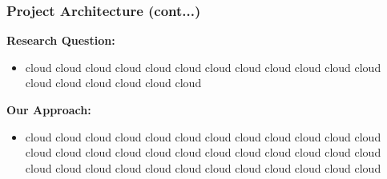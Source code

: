 \documentclass{beamer}
\begin{document}
\begin{frame}
\frametitle{Project Architecture (cont...)}
\textbf{Research Question:}
\begin{itemize}
  \item cloud cloud cloud cloud cloud cloud cloud cloud cloud cloud cloud cloud cloud cloud cloud cloud cloud cloud
\end{itemize}

\textbf{Our Approach:}
\begin{itemize}
  \item cloud cloud cloud cloud cloud cloud cloud cloud cloud cloud cloud cloud cloud cloud cloud cloud cloud cloud cloud cloud cloud cloud cloud cloud cloud cloud cloud cloud cloud cloud cloud cloud cloud cloud cloud cloud
\end{itemize}
\end{frame}
\end{document}
